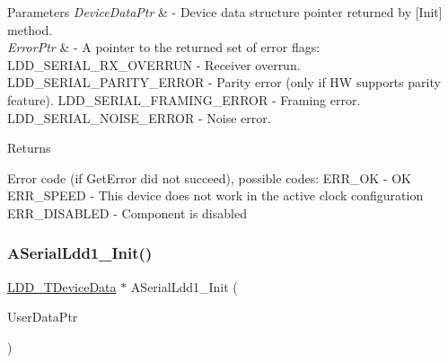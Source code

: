 \begin{DoxyParams}{Parameters}
{\em Device\+Data\+Ptr} & -\/ Device data structure pointer returned by \mbox{[}Init\mbox{]} method. \\
\hline
{\em Error\+Ptr} & -\/ A pointer to the returned set of error flags\+: L\+D\+D\+\_\+\+S\+E\+R\+I\+A\+L\+\_\+\+R\+X\+\_\+\+O\+V\+E\+R\+R\+UN -\/ Receiver overrun. L\+D\+D\+\_\+\+S\+E\+R\+I\+A\+L\+\_\+\+P\+A\+R\+I\+T\+Y\+\_\+\+E\+R\+R\+OR -\/ Parity error (only if HW supports parity feature). L\+D\+D\+\_\+\+S\+E\+R\+I\+A\+L\+\_\+\+F\+R\+A\+M\+I\+N\+G\+\_\+\+E\+R\+R\+OR -\/ Framing error. L\+D\+D\+\_\+\+S\+E\+R\+I\+A\+L\+\_\+\+N\+O\+I\+S\+E\+\_\+\+E\+R\+R\+OR -\/ Noise error. \\
\hline
\end{DoxyParams}
\begin{DoxyReturn}{Returns}

\begin{DoxyItemize}
\item Error code (if Get\+Error did not succeed), possible codes\+: E\+R\+R\+\_\+\+OK -\/ OK E\+R\+R\+\_\+\+S\+P\+E\+ED -\/ This device does not work in the active clock configuration E\+R\+R\+\_\+\+D\+I\+S\+A\+B\+L\+ED -\/ Component is disabled 
\end{DoxyItemize}
\end{DoxyReturn}
\mbox{\label{group___a_serial_ldd1__module_ga72a2988ac3b4e592eb9dd9c9cf0db38f}} 
\subsubsection{\texorpdfstring{A\+Serial\+Ldd1\+\_\+\+Init()}{ASerialLdd1\_Init()}}
{\footnotesize\ttfamily \hyperlink{group___p_e___types__module_gac5cf1362f1f0e3a2ce71b1bf2276d091}{L\+D\+D\+\_\+\+T\+Device\+Data} $\ast$ A\+Serial\+Ldd1\+\_\+\+Init (\begin{DoxyParamCaption}\item[{\hyperlink{group___p_e___types__module_ga0b66a73f87238a782318aa0be7578e35}{L\+D\+D\+\_\+\+T\+User\+Data} $\ast$}]{User\+Data\+Ptr }\end{DoxyParamCaption})}



